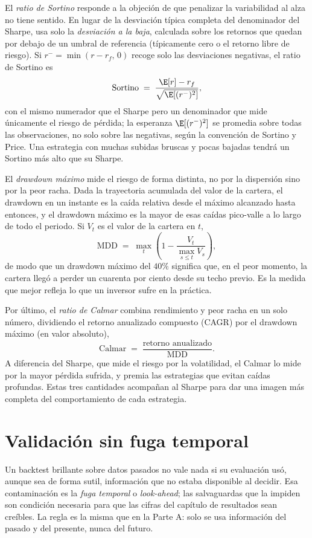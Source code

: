 El \emph{ratio de Sortino} responde a la objeción de que penalizar la variabilidad al alza no tiene sentido. En lugar de la desviación típica completa del denominador del Sharpe, usa solo la \emph{desviación a la baja}, calculada sobre los retornos que quedan por debajo de un umbral de referencia (típicamente cero o el retorno libre de riesgo). Si $r^- = \min(r - r_f,\, 0)$ recoge solo las desviaciones negativas, el ratio de Sortino es
\[
\mathrm{Sortino} \;=\; \frac{\E[r] - r_f}{\sqrt{\E[(r^-)^2]}},
\]
con el mismo numerador que el Sharpe pero un denominador que mide únicamente el riesgo de pérdida; la esperanza $\E[(r^-)^2]$ se promedia sobre todas las observaciones, no solo sobre las negativas, según la convención de Sortino y Price. Una estrategia con muchas subidas bruscas y pocas bajadas tendrá un Sortino más alto que su Sharpe.

El \emph{drawdown máximo} mide el riesgo de forma distinta, no por la dispersión sino por la peor racha. Dada la trayectoria acumulada del valor de la cartera, el drawdown en un instante es la caída relativa desde el máximo alcanzado hasta entonces, y el drawdown máximo es la mayor de esas caídas pico-valle a lo largo de todo el periodo. Si $V_t$ es el valor de la cartera en $t$,
\[
\mathrm{MDD} \;=\; \max_{t}\left(1 - \frac{V_t}{\max_{s \le t} V_s}\right),
\]
de modo que un drawdown máximo del $40\%$ significa que, en el peor momento, la cartera llegó a perder un cuarenta por ciento desde su techo previo. Es la medida que mejor refleja lo que un inversor sufre en la práctica.

Por último, el \emph{ratio de Calmar} combina rendimiento y peor racha en un solo número, dividiendo el retorno anualizado compuesto (CAGR) por el drawdown máximo (en valor absoluto),
\[
\mathrm{Calmar} \;=\; \frac{\text{retorno anualizado}}{\mathrm{MDD}}.
\]
A diferencia del Sharpe, que mide el riesgo por la volatilidad, el Calmar lo mide por la mayor pérdida sufrida, y premia las estrategias que evitan caídas profundas. Estas tres cantidades acompañan al Sharpe para dar una imagen más completa del comportamiento de cada estrategia.

\section{Validación sin fuga temporal}
\label{sec:cpcv}

Un backtest brillante sobre datos pasados no vale nada si su evaluación usó, aunque sea de forma sutil, información que no estaba disponible al decidir. Esa contaminación es la \emph{fuga temporal} o \emph{look-ahead}; las salvaguardas que la impiden son condición necesaria para que las cifras del capítulo de resultados sean creíbles. La regla es la misma que en la Parte A: solo se usa información del pasado y del presente, nunca del futuro.

